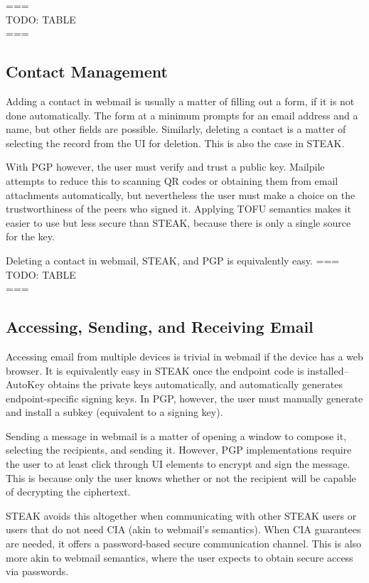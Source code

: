 ===\\ 
TODO: TABLE \\
===\\

\subsection{Contact Management}

Adding a contact in webmail is usually a matter of filling out a form, if it is not done automatically.  The form at a minimum prompts for an email address and a name, but other fields are possible.  Similarly, deleting a contact is a matter of selecting the record from the UI for deletion.  This is also the case in STEAK.

With PGP however, the user must verify and trust a public key.  Mailpile attempts to reduce this to scanning QR codes or obtaining them from email attachments automatically, but nevertheless the user must make a choice on the trustworthiness of the peers who signed it.  Applying TOFU semantics makes it easier to use but less secure than STEAK, because there is only a single source for the key.

Deleting a contact in webmail, STEAK, and PGP is equivalently easy.
===\\
TODO: TABLE \\
===\\

\subsection{Accessing, Sending, and Receiving Email}

Accessing email from multiple devices is trivial in webmail if the device has a web browser.  It is equivalently easy in STEAK once the endpoint code is installed--AutoKey obtains the private keys automatically, and automatically generates endpoint-specific signing keys.  In PGP, however, the user must manually generate and install a subkey (equivalent to a signing key).

Sending a message in webmail is a matter of opening a window to compose it, selecting the recipients, and sending it.  However, PGP implementations require the user to at least click through UI elements to encrypt and sign the message.  This is because only the user knows whether or not the recipient will be capable of decrypting the ciphertext.

STEAK avoids this altogether when communicating with other STEAK users or users that do not need CIA (akin to webmail’s semantics).  When CIA guarantees are needed, it offers a password-based secure communication channel.  This is also more akin to webmail semantics, where the user expects to obtain secure access via passwords.  

